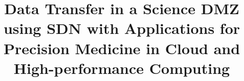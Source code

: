 \documentclass{sig-alternate-05-2015}
\begin{document}





\title{Data Transfer in a Science DMZ using SDN with Applications for Precision Medicine in Cloud and High-performance Computing}

\end{document}

